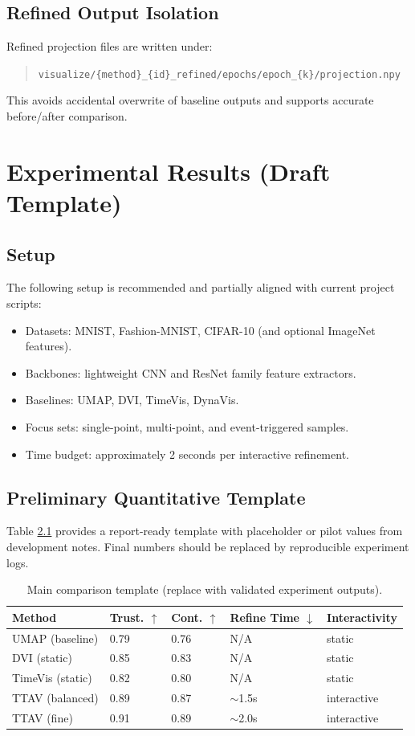 \documentclass[12pt,a4paper]{report}
\newcommand{\systemname}{TTAV}
\begin{document}
\section{Refined Output Isolation}
Refined projection files are written under:
\begin{quote}
\texttt{visualize/\{method\}\_\{id\}\_refined/epochs/epoch\_\{k\}/projection.npy}
\end{quote}
This avoids accidental overwrite of baseline outputs and supports accurate before/after comparison.

\chapter{Experimental Results (Draft Template)}
\section{Setup}
The following setup is recommended and partially aligned with current project scripts:
\begin{itemize}
\item Datasets: MNIST, Fashion-MNIST, CIFAR-10 (and optional ImageNet features).
\item Backbones: lightweight CNN and ResNet family feature extractors.
\item Baselines: UMAP, DVI, TimeVis, DynaVis.
\item Focus sets: single-point, multi-point, and event-triggered samples.
\item Time budget: approximately 2 seconds per interactive refinement.
\end{itemize}

\section{Preliminary Quantitative Template}
Table \ref{tab:main-results} provides a report-ready template with placeholder or pilot values from development notes. Final numbers should be replaced by reproducible experiment logs.

\begin{table}[htbp]
\centering
\begin{tabular}{p{}p{}p{}p{}p{}}
\toprule
Method & Trust. \(\uparrow\) & Cont. \(\uparrow\) & Refine Time \(\downarrow\) & Interactivity \\
\midrule
UMAP (baseline) & 0.79 & 0.76 & N/A & static \\
DVI (static) & 0.85 & 0.83 & N/A & static \\
TimeVis (static) & 0.82 & 0.80 & N/A & static \\
\systemname{} (balanced) & 0.89 & 0.87 & \(\sim\)1.5s & interactive \\
\systemname{} (fine) & 0.91 & 0.89 & \(\sim\)2.0s & interactive \\
\bottomrule
\end{tabular}
\caption{Main comparison template (replace with validated experiment outputs).}
\label{tab:main-results}
\end{table}
\end{document}
